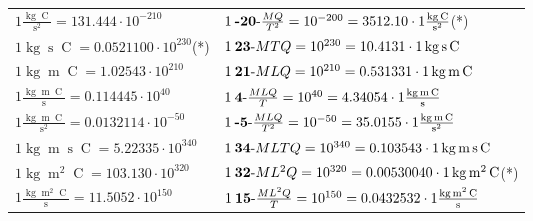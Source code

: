 \begin{center}
\begin{longtable}{l l}
{\color{black}$1 \bm{\mathrm{ }}\frac{\operatorname{kg}\operatorname{C}}{\operatorname{s}^2} = 131.444\cdot10^{-210} $}&
	{\color{black}$1\:\text{\textbf{-20}-} \frac{MQ}{T^2}=10^{-200} = 3512.10 \cdot 1 \bm{\mathrm{ }}\frac{\operatorname{kg}\operatorname{C}}{\operatorname{s}^2}$}\quad(*)\\
{\color{black}$1 \bm{\mathrm{ }}\operatorname{kg}\operatorname{s}\operatorname{C} = 0.0521100\cdot10^{230} $}\quad(*)&
	{\color{black}$1\:\text{\textbf{23}-} MTQ=10^{230} = 10.4131 \cdot 1 \bm{\mathrm{ }}\operatorname{kg}\operatorname{s}\operatorname{C}$}\\
{\color{black}$1 \bm{\mathrm{ }}\operatorname{kg}\operatorname{m}\operatorname{C} = 1.02543\cdot10^{210} $}&
	{\color{black}$1\:\text{\textbf{21}-} MLQ=10^{210} = 0.531331 \cdot 1 \bm{\mathrm{ }}\operatorname{kg}\operatorname{m}\operatorname{C}$}\\
{\color{black}$1 \bm{\mathrm{ }}\frac{\operatorname{kg}\operatorname{m}\operatorname{C}}{\operatorname{s}} = 0.114445\cdot10^{40} $}&
	{\color{black}$1\:\text{\textbf{4}-} \frac{MLQ}{T}=10^{40} = 4.34054 \cdot 1 \bm{\mathrm{ }}\frac{\operatorname{kg}\operatorname{m}\operatorname{C}}{\operatorname{s}}$}\\
{\color{black}$1 \bm{\mathrm{ }}\frac{\operatorname{kg}\operatorname{m}\operatorname{C}}{\operatorname{s}^2} = 0.0132114\cdot10^{-50} $}&
	{\color{black}$1\:\text{\textbf{-5}-} \frac{MLQ}{T^2}=10^{-50} = 35.0155 \cdot 1 \bm{\mathrm{ }}\frac{\operatorname{kg}\operatorname{m}\operatorname{C}}{\operatorname{s}^2}$}\\
{\color{black}$1 \bm{\mathrm{ }}\operatorname{kg}\operatorname{m}\operatorname{s}\operatorname{C} = 5.22335\cdot10^{340} $}&
	{\color{black}$1\:\text{\textbf{34}-} MLTQ=10^{340} = 0.103543 \cdot 1 \bm{\mathrm{ }}\operatorname{kg}\operatorname{m}\operatorname{s}\operatorname{C}$}\\
{\color{black}$1 \bm{\mathrm{ }}\operatorname{kg}\operatorname{m}^2\operatorname{C} = 103.130\cdot10^{320} $}&
	{\color{black}$1\:\text{\textbf{32}-} ML^2Q=10^{320} = 0.00530040 \cdot 1 \bm{\mathrm{ }}\operatorname{kg}\operatorname{m}^2\operatorname{C}$}\quad(*)\\
{\color{black}$1 \bm{\mathrm{ }}\frac{\operatorname{kg}\operatorname{m}^2\operatorname{C}}{\operatorname{s}} = 11.5052\cdot10^{150} $}&
	{\color{black}$1\:\text{\textbf{15}-} \frac{ML^2Q}{T}=10^{150} = 0.0432532 \cdot 1 \bm{\mathrm{ }}\frac{\operatorname{kg}\operatorname{m}^2\operatorname{C}}{\operatorname{s}}$}\\

\end{longtable}
\end{center}
